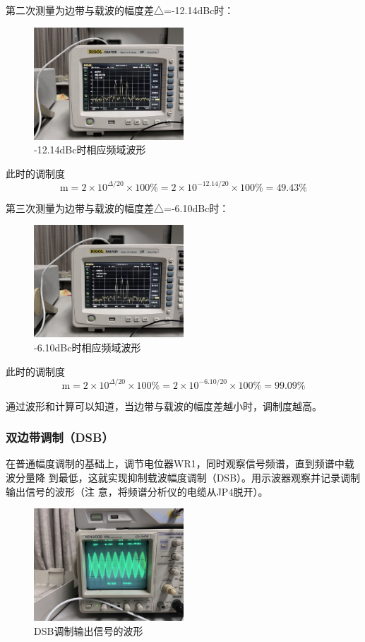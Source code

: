 \documentclass{../source/Experiment}
\begin{document}
第二次测量为边带与载波的幅度差△=-12.14dBc时：
\begin{figure}[H]
    \centering
    \includegraphics[width = 0.5\textwidth]{lab6/2.jpg}
    \caption{-12.14dBc时相应频域波形}
\end{figure}
此时的调制度$$\mathrm{m}=2 \times 10^{\Delta / 20} \times 100 \%=2 \times 10^{-12.14 / 20} \times 100 \%
    =49.43\%$$

第三次测量为边带与载波的幅度差△=-6.10dBc时：
\begin{figure}[H]
    \centering
    \includegraphics[width = 0.5\textwidth]{lab6/3.jpg}
    \caption{-6.10dBc时相应频域波形}
\end{figure}
此时的调制度$$\mathrm{m}=2 \times 10^{\Delta / 20} \times 100 \%=2 \times 10^{-6.10 / 20} \times 100 \%
    =99.09\%$$

通过波形和计算可以知道，当边带与载波的幅度差越小时，调制度越高。

\subsubsection{双边带调制（DSB）}
在普通幅度调制的基础上，调节电位器WR1，同时观察信号频谱，直到频谱中载波分量降
到最低，这就实现抑制载波幅度调制（DSB）。用示波器观察并记录调制输出信号的波形（注
意，将频谱分析仪的电缆从JP4脱开）。

\begin{figure}[H]
    \centering
    \includegraphics[width = 0.5\textwidth]{lab6/4.jpg}
    \caption{DSB调制输出信号的波形}
\end{figure}
\end{document}
